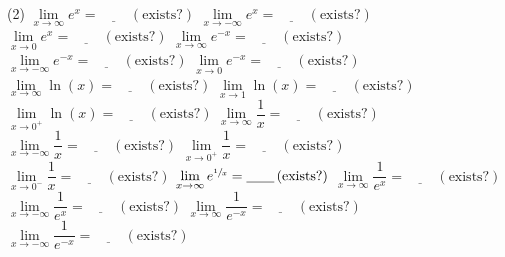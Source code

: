 \documentclass[10pt,oneside,]{book}
\theoremstyle{plain}
\theoremstyle{definition}
\numberwithin{equation}{section}
\newcommand{\fe}[2]{#1\mathopen{}\left(#2\right)\mathclose{}}
\begin{document}
\par
\begin{exercisegroup}(2)
\exercise[24.]\hypertarget{exercise-160}{\null}\(\lim\limits_{x\to\infty}e^x=\underline{\qquad}\,(\text{exists?})\)%
\exercise[25.]\hypertarget{exercise-161}{\null}\(\lim\limits_{x\to-\infty}e^x=\underline{\qquad}\,(\text{exists?})\)%
\exercise[26.]\hypertarget{exercise-162}{\null}\(\lim\limits_{x\to0}e^x=\underline{\qquad}\,(\text{exists?})\)%
\exercise[27.]\hypertarget{exercise-163}{\null}\(\lim\limits_{x\to\infty}e^{-x}=\underline{\qquad}\,(\text{exists?})\)%
\exercise[28.]\hypertarget{exercise-164}{\null}\(\lim\limits_{x\to-\infty}e^{-x}=\underline{\qquad}\,(\text{exists?})\)%
\exercise[29.]\hypertarget{exercise-165}{\null}\(\lim\limits_{x\to0}e^{-x}=\underline{\qquad}\,(\text{exists?})\)%
\exercise[30.]\hypertarget{exercise-166}{\null}\(\lim\limits_{x\to\infty}\fe{\ln}{x}=\underline{\qquad}\,(\text{exists?})\)%
\exercise[31.]\hypertarget{exercise-167}{\null}\(\lim\limits_{x\to1}\fe{\ln}{x}=\underline{\qquad}\,(\text{exists?})\)%
\exercise[32.]\hypertarget{exercise-168}{\null}\(\lim\limits_{x\to0^{+}}\fe{\ln}{x}=\underline{\qquad}\,(\text{exists?})\)%
\exercise[33.]\hypertarget{exercise-169}{\null}\(\lim\limits_{x\to\infty}\dfrac{1}{x}=\underline{\qquad}\,(\text{exists?})\)%
\exercise[34.]\hypertarget{exercise-170}{\null}\(\lim\limits_{x\to-\infty}\dfrac{1}{x}=\underline{\qquad}\,(\text{exists?})\)%
\exercise[35.]\hypertarget{exercise-171}{\null}\(\lim\limits_{x\to0^{+}}\dfrac{1}{x}=\underline{\qquad}\,(\text{exists?})\)%
\exercise[36.]\hypertarget{exercise-172}{\null}\(\lim\limits_{x\to0^{-}}\dfrac{1}{x}=\underline{\qquad}\,(\text{exists?})\)%
\exercise[37.]\hypertarget{exercise-173}{\null}\(\lim\limits_{x\to\infty}e^{\sfrac{1}{x}}=\underline{\qquad}\,(\text{exists?})\)%
\exercise[38.]\hypertarget{exercise-174}{\null}\(\lim\limits_{x\to\infty}\dfrac{1}{e^x}=\underline{\qquad}\,(\text{exists?})\)%
\exercise[39.]\hypertarget{exercise-175}{\null}\(\lim\limits_{x\to-\infty}\dfrac{1}{e^x}=\underline{\qquad}\,(\text{exists?})\)%
\exercise[40.]\hypertarget{exercise-176}{\null}\(\lim\limits_{x\to\infty}\dfrac{1}{e^{-x}}=\underline{\qquad}\,(\text{exists?})\)%
\exercise[41.]\hypertarget{exercise-177}{\null}\(\lim\limits_{x\to-\infty}\dfrac{1}{e^{-x}}=\underline{\qquad}\,(\text{exists?})\)%
\end{exercisegroup}
\par\smallskip\noindent
\typeout{************************************************}
\typeout{************************************************}
\end{document}
